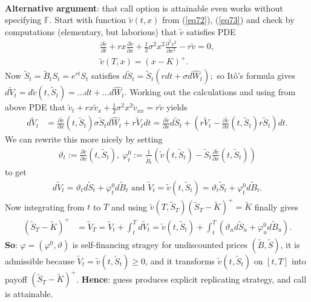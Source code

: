 \documentclass[12pt,a4paper, twoside]{article}
\theoremstyle{definition}
\begin{document}
\\
\textbf{Alternative argument}: that call option is attainable even works without specifying $\mathbb{F}$. Start with function $\widetilde{v}(t,x)$ from (\ref{eq72}), (\ref{eq73}) and check by computations (elementary, but laborious) that $\widetilde{v}$ satisfies PDE
\begin{align*}
\frac{\partial \widetilde{v}}{\partial t}+ rx \frac{\partial \widetilde{v}}{\partial x}+ \frac{1}{2} \sigma^2 x^2 \frac{\partial^2 v^2}{\partial x^2}-r \widetilde{v}=0,\\
\widetilde{v}(T,x)= (x-K)^+.
\end{align*}
Now $\widetilde{S}_t= \widetilde{B}_t S_t = e^{rt}S_t$ satisfies $d \widetilde{S}_t= \widetilde{S}_t(rdt + \sigma d \widehat{W}_t);$ so Itô's formula gives $d \widetilde{V}_t = d \widetilde{v}(t, \widetilde{S}_t)= \dots dt +  \dots d \widehat{W}_t$. Working out the calculations and using from above PDE that $\widetilde{v}_t + rx \widetilde{v}_x + \frac{1}{2} \sigma^2x^2 \widetilde{v}_{xx}=r \widetilde{v}$ yields
\begin{align*}
d \widetilde{V}_t &= \frac{\partial \widetilde{v}}{\partial x}(t, \widetilde{S}_t) \sigma \widetilde{S}_t d \widehat{W}_t + r \widetilde{V}_t dt = \frac{\partial \widetilde{v}}{\partial x} d \widetilde{S}_t +  \left( r \widetilde{V}_t - \frac{\partial \widetilde{v}}{\partial x}(t, \widetilde{S}_t) r \widetilde{S}_t \right) dt.
\end{align*}
We can rewrite this more nicely by setting
\begin{align*}
\vartheta_t := \frac{\partial \widetilde{v}}{\partial x}(t, \widetilde{S}_t), \ \varphi_t^0 := \frac{1}{\widetilde{B}_t} \left( \widetilde{v}(t, \widetilde{S}_t)- \widetilde{S}_t \frac{\partial \widetilde{v}}{\partial x}(t, \widetilde{S}_t) \right)
\end{align*}
to get
\begin{align*}
d \widetilde{V}_t = \vartheta_t d \widetilde{S}_t + \varphi_t^0 d \widetilde{B}_t \text{ and } \widetilde{V}_t = \widetilde{v}(t, \widetilde{S}_t) = \vartheta_t \widetilde{S}_t + \varphi_t^0 d  \widetilde{B}_t. 
\end{align*}
\newpage
Now integrating from $t$ to $T$ and using $\widetilde{v}(T, \widetilde{S}_T)(\widetilde{S}_T-\widetilde{K})^+= \widetilde{K}$ finally gives 
\begin{align*}
( \widetilde{S}_T- \widetilde{K})^+ &= \widetilde{V}_T = \widetilde{V}_t + \int_t^T d \widetilde{V}_t = \widetilde{v}(t, \widetilde{S}_t) + \int_t^T( \vartheta_u d \widetilde{S}_u + \varphi_u^0 d \widetilde{B}_u ).
\end{align*}
\textbf{So}: $\varphi=( \varphi^0, \vartheta)$ is self-financing stragey for undiscounted prices $( \widetilde{B}, \widetilde{S})$, it is admissible because $\widetilde{V}_t= \widetilde{v}(t, \widetilde{S}_t) \geq 0$, and it transforms $\widetilde{v}(t, \widetilde{S}_t)$ on $[t,T]$ into payoff $( \widetilde{S}_T- \widetilde{K})^+$. \textbf{Hence}: guess produces explicit replicating strategy, and call is attainable. 
\newpage
\end{document}
